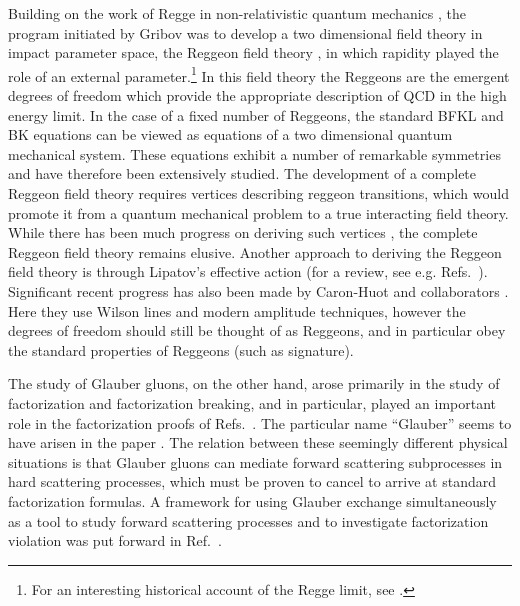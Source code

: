 \documentclass[letterpaper,11pt]{article}
\begin{document}
Building on the work of Regge in non-relativistic quantum mechanics \cite{Regge:1959mz}, the program initiated by Gribov \cite{Gribov:1968fc,Abarbanel:1975me,Baker:1976cv} was to develop a two dimensional field theory in impact parameter space, the Reggeon field theory \cite{Gribov:1968fc,Abarbanel:1975me,Baker:1976cv}, in which rapidity played the role of an external parameter.\footnote{For an interesting historical account of the Regge limit, see \cite{DelDuca:2018nsu}. } In this field theory the Reggeons are the emergent degrees of freedom which provide the appropriate description of QCD in the high energy limit. In the case of a fixed number of Reggeons, the standard BFKL and BK equations can be viewed as equations of a two dimensional quantum mechanical system. These equations exhibit a number of remarkable symmetries \cite{Lipatov:1993yb,Faddeev:1994zg} and have therefore been extensively studied. The development of a complete Reggeon field theory requires vertices describing reggeon transitions, which would promote it from a quantum mechanical problem to a true interacting field theory. While there has been much progress on deriving such vertices \cite{Bartels:1995kf,Bartels:1999aw,Bartels:2002au,Bartels:2004hb,Bartels:2007dm}, the complete Reggeon field theory remains elusive. Another approach to deriving the Reggeon field theory is through Lipatov's effective action \cite{Lipatov:1995pn} (for a review, see e.g. Refs.~\cite{Lipatov:1996ts,Hentschinski:2009zz}). Significant recent progress has also been made by Caron-Huot and collaborators \cite{Caron-Huot:2013fea,Caron-Huot:2017fxr,Caron-Huot:2017zfo}. Here they use Wilson lines and modern amplitude techniques, however the degrees of freedom should still be thought of as Reggeons, and in particular obey the standard properties of Reggeons (such as signature).

The study of Glauber gluons, on the other hand, arose primarily in the study of factorization and factorization breaking, and in particular, played an important role in the factorization proofs of Refs.~\cite{Collins:1985ue,Collins:1989gx,Collins:1988ig}. The particular name ``Glauber'' seems to have arisen in the paper \cite{Bodwin:1981fv}. The relation between these seemingly different physical situations is that Glauber gluons can mediate forward scattering subprocesses in hard scattering processes, which must be proven to cancel to arrive at standard factorization formulas. A framework for using Glauber exchange simultaneously as a tool to study forward scattering processes and to investigate factorization violation was put forward in Ref.~\cite{Rothstein:2016bsq}.
\end{document}
